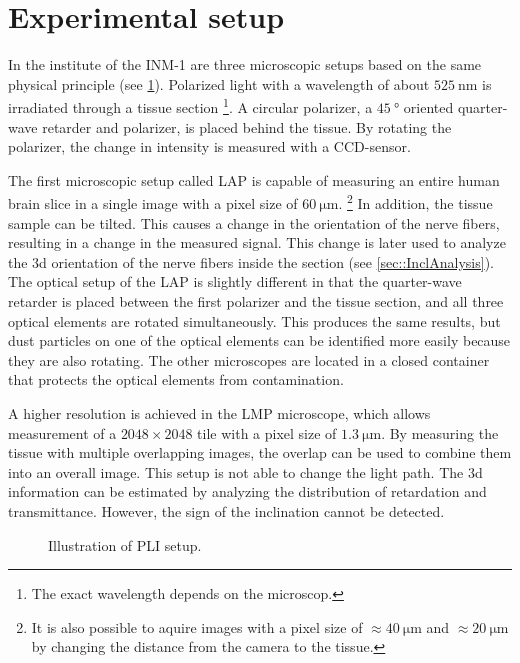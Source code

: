 \section{Experimental setup}\label{sec:expSetup}
%
In the institute of the \ac{INM-1} are three microscopic setups based on the same physical principle \cite{Axer2011} (see \cref{fig:pli_setup}).
Polarized light with a wavelength of about $\SI{525}{\nano\meter}$ is irradiated through a tissue section \footnote{The exact wavelength depends on the microscop.}.
A circular polarizer, a $\SI{45}{\degree}$ oriented quarter-wave retarder and polarizer, is placed behind the tissue.
By rotating the polarizer, the change in intensity is measured with a \ac{CCD}-sensor.
\par
%
The first microscopic setup called \ac{LAP} is capable of measuring an entire human brain slice in a single image with a pixel size of $\SI{60}{\micro\meter}$. \footnote{It is also possible to aquire images with a pixel size of $\approx \SI{40}{\micro\meter}$ and $\approx \SI{20}{\micro\meter}$ by changing the distance from the camera to the tissue.}
In addition, the tissue sample can be tilted.
This causes a change in the orientation of the nerve fibers, resulting in a change in the measured signal.
This change is later used to analyze the 3d orientation of the nerve fibers inside the section (see \cref{sec::InclAnalysis}).
The optical setup of the \ac{LAP} is slightly different in that the quarter-wave retarder is placed between the first polarizer and the tissue section, and all three optical elements are rotated simultaneously.
This produces the same results, but dust particles on one of the optical elements can be identified more easily because they are also rotating.
The other microscopes are located in a closed container that protects the optical elements from contamination.
\par
% 
A higher resolution is achieved in the \ac{LMP} microscope, which allows measurement of a $\num{2048}\times\num{2048}$ tile with a pixel size of $\SI{1.3}{\micro\meter}$.
By measuring the tissue with multiple overlapping images, the overlap can be used to combine them into an overall image.
This setup is not able to change the light path.
The 3d information can be estimated by analyzing the distribution of retardation and transmittance.
However, the sign of the inclination cannot be detected.
\par
% 
\begin{figure}[!t]
    \captionsetup[sub]{position=top}
    \setlength{\tikzwidth}{\textwidth}
	\centering
	\caption{Illustration of PLI setup.}
	\label{fig:pli_setup}
\end{figure}
